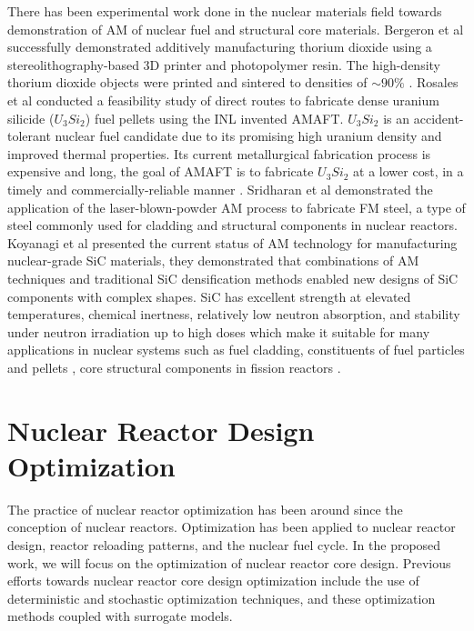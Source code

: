 There has been experimental work done in the nuclear materials field towards 
demonstration of \gls{AM} of nuclear fuel and structural core materials. 
Bergeron et al \cite{bergeron_early_2018} successfully demonstrated additively 
manufacturing thorium dioxide using a stereolithography-based 3D printer 
and photopolymer resin. 
The high-density thorium dioxide objects were printed and sintered to densities 
of $\sim90\%$ \cite{bergeron_early_2018}. 
Rosales et al \cite{rosales_characterizing_2019} conducted a feasibility study 
of direct routes to fabricate dense uranium silicide ($U_3Si_2$) fuel pellets 
using the \gls{INL} invented \gls{AMAFT}. 
$U_3Si_2$ is an accident-tolerant nuclear fuel candidate due to its promising 
high uranium density and improved thermal properties. 
Its current metallurgical fabrication process is expensive and long, the goal of
\gls{AMAFT} is to fabricate $U_3Si_2$ at a lower cost, in a timely and
commercially-reliable manner \cite{rosales_characterizing_2019}.  
Sridharan et al \cite{sridharan_performance_2019} demonstrated the application of
the laser-blown-powder \gls{AM} process to fabricate \gls{FM} steel, a type of 
steel commonly used for cladding and structural components in nuclear reactors. 
Koyanagi et al \cite{koyanagi_additive_2020} presented the current status of 
\gls{AM} technology for manufacturing nuclear-grade \gls{SiC} materials, they 
demonstrated that combinations of \gls{AM} techniques and traditional \gls{SiC} 
densification methods enabled new designs of \gls{SiC} components with complex shapes. 
\gls{SiC} has excellent strength at elevated temperatures, chemical inertness, 
relatively low neutron absorption, and stability under neutron irradiation up 
to high doses \cite{sauder_ceramic_2014, snead_handbook_2007,koyanagi_additive_2020} 
which make it suitable for many applications in nuclear systems such as fuel cladding, 
constituents of fuel particles \cite{snead_handbook_2007} and pellets
\cite{terrani_progress_2015}, core structural components in fission reactors 
\cite{sauder_ceramic_2014}. 

\section{Nuclear Reactor Design Optimization}
\label{sec:opt}
The practice of nuclear reactor optimization has been around since the conception of 
nuclear reactors. 
Optimization has been applied to nuclear reactor design, reactor reloading 
patterns, and the nuclear fuel cycle.  
In the proposed work, we will focus on the optimization of nuclear reactor 
core design. 
Previous efforts towards nuclear reactor core design optimization include the use 
of deterministic and stochastic optimization techniques, and these optimization 
methods coupled with surrogate models. 

